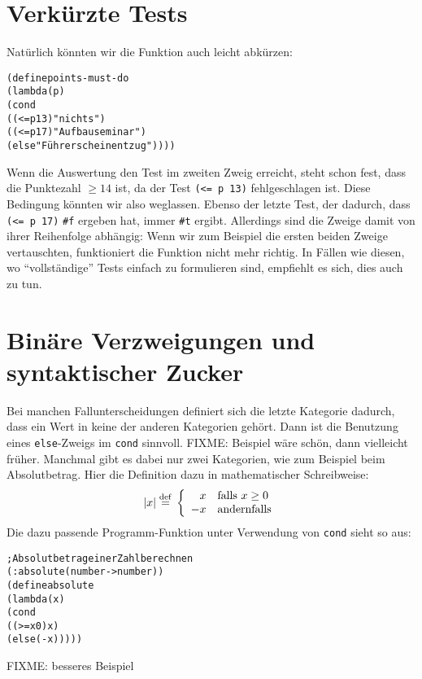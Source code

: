 \section{Verkürzte Tests}

Natürlich könnten wir die Funktion auch leicht abkürzen:
%
\begin{alltt}
(define points-must-do
  (lambda (p)
    (cond
      ((<= p 13) "nichts")
      ((<= p 17) "Aufbauseminar")
      (else "Führerscheinentzug"))))
\end{alltt}
%
Wenn die Auswertung den Test im zweiten Zweig erreicht, steht schon
fest, dass die Punktezahl $\geq 14$ ist, da der Test \verb|(<= p 13)|
fehlgeschlagen ist.  Diese Bedingung könnten wir also weglassen.
Ebenso der letzte Test, der dadurch, dass \verb|(<= p 17)| \verb|#f|
ergeben hat, immer \verb|#t| ergibt.  Allerdings sind die Zweige damit
von ihrer Reihenfolge abhängig: Wenn wir zum Beispiel die ersten
beiden Zweige vertauschten, funktioniert die Funktion nicht mehr
richtig.  In Fällen wie diesen, wo "`vollständige"' Tests einfach zu
formulieren sind, empfiehlt es sich, dies auch zu tun.

\begin{mantra}\label{mantra:comprehensive-tests}
  
\end{mantra}

\section{Binäre Verzweigungen und syntaktischer Zucker}
\label{sec:binaere-verzweigungen}

Bei manchen Fallunterscheidungen definiert sich die letzte Kategorie
dadurch, dass ein Wert in keine der anderen Kategorien gehört.  Dann
ist die Benutzung eines \texttt{else}-Zweigs im \texttt{cond}
sinnvoll.
FIXME: Beispiel wäre schön, dann vielleicht früher.  
Manchmal gibt es dabei nur zwei Kategorien, wie
zum Beispiel beim Absolutbetrag.  Hier die Definition dazu in mathematischer
Schreibweise:
%
\begin{displaymath}
  |x| \stackrel{\rm def}{=}{} \left\{\begin{array}{rl}
      x & \textrm{falls } x \geq 0\\
      -x & \textrm{andernfalls}
    \end{array}
    \right.
\end{displaymath}
%
Die dazu passende Programm-Funktion unter Verwendung von \texttt{cond}
sieht so aus:
%
\begin{alltt}
; Absolutbetrag einer Zahl berechnen
(: absolute (number -> number))
(define absolute
  (lambda (x)
    (cond
     ((>= x 0) x)
     (else (- x)))))
\end{alltt}
FIXME: besseres Beispiel


